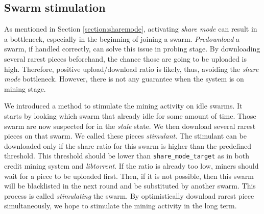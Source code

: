 \subsection{Swarm stimulation}
\label{section:swarmstimulate}
As mentioned in Section \ref{section:sharemode}, activating \textit{share mode} can result in a bottleneck, especially in the beginning of joining a swarm. \textit{Predownload} a swarm, if handled correctly, can solve this issue in probing stage. By downloading several rarest pieces beforehand, the chance those are going to be uploaded is high. Therefore, positive upload/download ratio is likely, thus, avoiding the \textit{share mode} bottleneck. However, there is not any guarantee when the system is on mining stage.

We introduced a method to stimulate the mining activity on idle swarms. It starts by looking which swarm that already idle for some amount of time. Those swarm are now suspected for in the \textit{stale} state. We then download several rarest pieces on that swarm. We called these pieces \textit{stimulant}. The stimulant can be downloaded only if the share ratio for this swarm is higher than the predefined threshold. This threshold should be lower than \texttt{share\_mode\_target} as in both credit mining system and \textit{libtorrent}. If the ratio is already too low, miners should wait for a piece to be uploaded first. Then, if it is not possible, then this swarm will be blacklisted in the next round and be substituted by another swarm. This process is called \textit{stimulating} the swarm. By optimistically download rarest piece simultaneously, we hope to stimulate the mining activity in the long term.